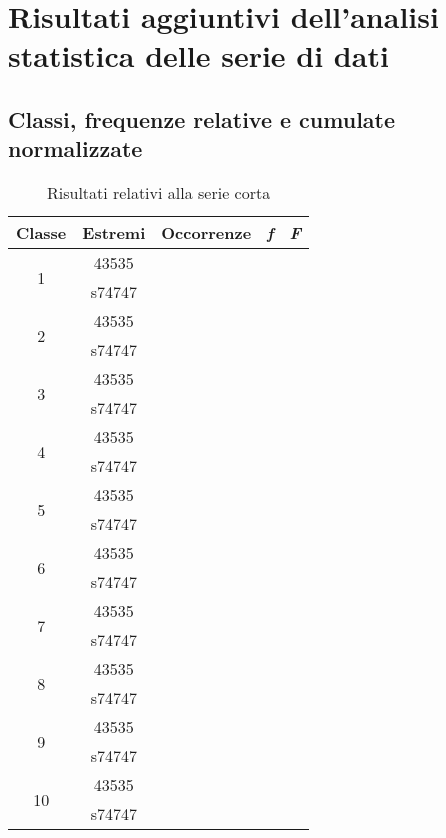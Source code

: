 \section{Risultati aggiuntivi dell'analisi statistica delle serie di dati}


\subsection{Classi, frequenze relative e cumulate normalizzate}


\begin{table}[H]
	\centering
	\begin{tabular}{c|c|c|c|c}
		\toprule
		\toprule
		\textbf{Classe}&\textbf{Estremi} &\textbf{Occorrenze}&\textbf{\textit{f}}&\textbf{\textit{F}}\\
		\midrule
		\midrule
		\multirow{2}{*}{1}&43535&\multirow{2}{*}{}&\multirow{2}{*}{}&\multirow{2}{*}{} \\
		&s74747&&&\\
		\midrule
		\multirow{2}{*}{2}&43535&\multirow{2}{*}{}&\multirow{2}{*}{}&\multirow{2}{*}{} \\
		&s74747&&&\\
		\midrule
		\multirow{2}{*}{3}&43535&\multirow{2}{*}{}&\multirow{2}{*}{}&\multirow{2}{*}{} \\
		&s74747&&&\\
		\midrule
		\multirow{2}{*}{4}&43535&\multirow{2}{*}{}&\multirow{2}{*}{}&\multirow{2}{*}{} \\
		&s74747&&&\\
		\midrule
		\multirow{2}{*}{5}&43535&\multirow{2}{*}{}&\multirow{2}{*}{}&\multirow{2}{*}{} \\
		&s74747&&&\\
		\midrule
		\multirow{2}{*}{6}&43535&\multirow{2}{*}{}&\multirow{2}{*}{}&\multirow{2}{*}{} \\
		&s74747&&&\\
		\midrule
		\multirow{2}{*}{7}&43535&\multirow{2}{*}{}&\multirow{2}{*}{}&\multirow{2}{*}{} \\
		&s74747&&&\\
		\midrule
		\multirow{2}{*}{8}&43535&\multirow{2}{*}{}&\multirow{2}{*}{}&\multirow{2}{*}{} \\
		&s74747&&&\\
		\midrule
		\multirow{2}{*}{9}&43535&\multirow{2}{*}{}&\multirow{2}{*}{}&\multirow{2}{*}{} \\
		&s74747&&&\\
		\midrule
		\multirow{2}{*}{10}&43535&\multirow{2}{*}{}&\multirow{2}{*}{}&\multirow{2}{*}{} \\
		&s74747&&&\\
		\bottomrule
		\bottomrule
	\end{tabular}
	\caption{Risultati relativi alla serie corta}
	\label{tab:seriecorta}
\end{table} 
